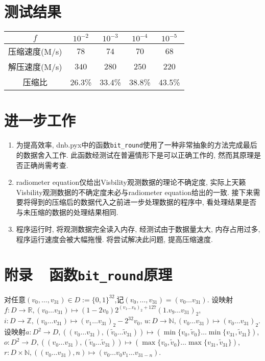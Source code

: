 \documentclass[12pt]{ctexart}
\def\m{\mapsto}
\def\ra{\rightarrow}
\def\v{\verb}
\begin{document}
\section{测试结果}
\begin{table}[!htb]
    \centering
    \begin{tabular}{c|cccc}
        \hline
        $f$&$10^{-2}$&$10^{-3}$&$10^{-4}$&$10^{-5}$\\
        \hline
        压缩速度(M/s)&$78$&$74$&$70$&$68$\\
        \hline
        解压速度(M/s)&$340$&$280$&$250$&$220$\\
        \hline
        压缩比&26.3\%&33.4\%&38.8\%&43.5\%\\
        \hline
    \end{tabular}
\end{table}
\section{进一步工作}
\begin{enumerate}
    \item 为提高效率, dnb.pyx中的函数\v|bit_round|使用了一种非常抽象的方法完成最后的数据舍入工作. 此函数经测试在普遍情形下是可以正确工作的, 然而其原理是否正确尚需考查.
    \item radiometer equation仅给出Visbility观测数据的理论不确定度, 实际上天籁Visbility观测数据的不确定度未必与radiometer equation给出的一致. 接下来需要将得到的压缩后的数据代入之前进一步处理数据的程序中, 看处理结果是否与未压缩的数据的处理结果相同.
    \item 程序运行时, 将观测数据完全读入内存, 经测试由于数据量太大, 内存占用过多, 程序运行速度会被大幅拖慢. 将尝试解决此问题, 提高压缩速度.
\end{enumerate}

\newpage
\pagestyle{empty}

\section*{附录~~函数$\!$\texttt{bit\_{}round}原理}

对任意$(v_0,\dots,v_{31})\in D:=\{0,1\}^{32}$,记$(v_0,\dots,v_{31})=(v_0\dots v_{31})$. 设映射$f\!:D\ra\mathbb{R},(v_0\dots v_{31})\m(1-2v_0)2^{(v_1\dots v_8)_2+127}(1.v_9\dots v_{31})_2$, $i\!:D\ra\mathbb{Z},(v_0\dots v_{31})\m(v_1\dots v_{31})_2-2^{32}v_0$, $u\!:D\ra\mathbb{N},(v_0\dots v_{31})\m(v_0\dots v_{31})_2$. 设映射$a\!:D^2\ra D,((v_0\dots v_{31}),(\tilde{v}_0\dots \tilde{v}_{31}))\m(\min\{v_0,\tilde{v}_0\}\dots\min\{v_{31},\tilde{v}_{31}\})$, $o\!:D^2\ra D,((v_0\dots v_{31}),(\tilde{v}_0\dots \tilde{v}_{31}))\m(\max\{v_0,\tilde{v}_0\}\dots\max\{v_{31},\tilde{v}_{31}\})$, $r\!:D\times\mathbb{N},((v_0\dots v_{31}),n)\m(v_0\dots v_0v_1\dots v_{31-n})$.
\end{document}
